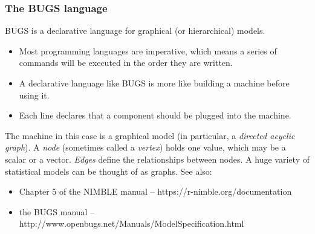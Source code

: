 \documentclass{beamer}\usepackage[]{graphicx}\usepackage[]{color}
\begin{document}
\begin{frame}[fragile] 
\sffamily
\frametitle{The BUGS language}
{\footnotesize

BUGS is a declarative language for graphical (or hierarchical) models.
\begin{itemize}
\item Most programming languages are imperative, which means a series of
commands will be executed in the order they are written.
\item A declarative language like BUGS is more like building a machine before
using it.
\item Each line declares that a component should be plugged into
the machine.
\end{itemize}

The machine in this case is a graphical model (in particular, a
  \textit{directed acyclic graph}).  A \textit{node} (sometimes called
a \textit{vertex}) holds one value, which may be a scalar or a vector.
\textit{Edges} define the relationships between nodes.  A huge variety
of statistical models can be thought of as graphs.  See also:
\begin{itemize}
\item Chapter 5 of the NIMBLE manual -- https://r-nimble.org/documentation
\item the BUGS manual -- http://www.openbugs.net/Manuals/ModelSpecification.html
\end{itemize}
}

\end{frame}
\end{document}
